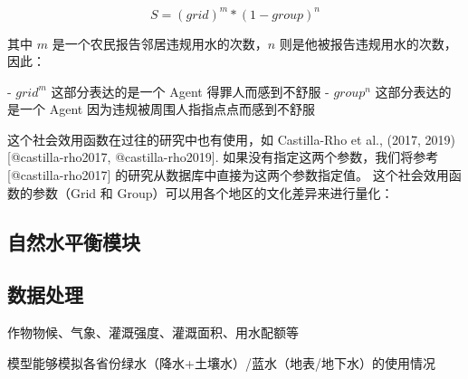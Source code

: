 \begin{equation}
    S = {(grid)}^m * {(1 - group)}^n
    \label{ch6:eq:society}
\end{equation}

其中 $m$ 是一个农民报告邻居违规用水的次数，$n$ 则是他被报告违规用水的次数，因此：

- $grid^m$ 这部分表达的是一个 Agent 得罪人而感到不舒服
- $group^n$ 这部分表达的是一个 Agent 因为违规被周围人指指点点而感到不舒服

这个社会效用函数在过往的研究中也有使用，如 Castilla-Rho et al., (2017, 2019) [@castilla-rho2017, @castilla-rho2019]. 如果没有指定这两个参数，我们将参考 [@castilla-rho2017] 的研究从数据库中直接为这两个参数指定值。
这个社会效用函数的参数（Grid 和 Group）可以用各个地区的文化差异来进行量化：


\subsection{自然水平衡模块}

\subsection{数据处理}

作物物候、气象、灌溉强度、灌溉面积、用水配额等

模型能够模拟各省份绿水（降水+土壤水）/蓝水（地表/地下水）的使用情况
